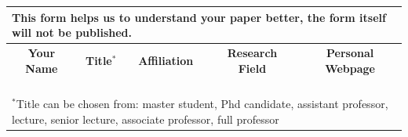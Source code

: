 \documentclass[conference]{IEEEtran}
\begin{document}
\begin{table}[h]
	\centering  {}   %
	\begin{tabular}{|c|c|c|c|c|}
		\multicolumn{5}{l}{This form helps us to understand your paper better, {\color{red} the form itself will not be published.}} \\
		\hline 
		\bfseries Your Name & \bfseries Title$^{\mathrm{*}}$ & \bfseries Affiliation &\bfseries Research Field & \bfseries Personal Webpage \\ 
		\hline 
		&  &  &  &  \\ 
		\hline 
		&  &  &  &  \\ 
		\hline 
		&  &  &  &  \\ 
		\hline 
		&  &  &  &  \\ 
		\hline 
		\multicolumn{5}{l}{$^{\mathrm{*}}$Title can be chosen from: master student, Phd candidate, assistant professor, lecture, senior lecture, associate professor, full professor}
	\end{tabular} 
\end{table}
\end{document}
